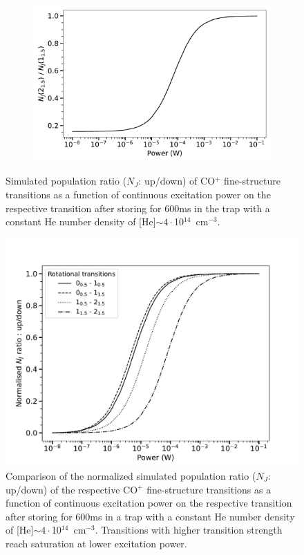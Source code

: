 \begin{figure}[!htb]
\begin{subfigure}[b]{0.49\textwidth}
    \end{subfigure}
    \hfill
    \begin{subfigure}[b]{0.49\textwidth}
        \centering
        \includegraphics[width=1\textwidth]{chapters/CO+_ROSAA_paper/SI/functionOfpower_CO^+_1_1.5 - 2_1.5_4.e+14.pdf}
    \end{subfigure}
    \caption{Simulated population ratio ($N_J$: up/down) of CO$^+$ fine-structure transitions as a function of continuous excitation power on the respective transition after storing for 600ms in the trap with a constant He number density of [He]$\sim4\cdot$10$^{14}$~cm$^{-3}$.}
    \label{fig:SI:CO+:power}
\end{figure}

\begin{figure}
    \centering
    \includegraphics[width=1\textwidth]{chapters/CO+_ROSAA_paper/SI/compareTransitions.pdf}
    \caption{Comparison of the normalized simulated population ratio ($N_J$: up/down) of the respective CO$^+$ fine-structure transitions as a function of continuous excitation power on the respective transition after storing for 600ms in a trap with a constant He number density of [He]$\sim4\cdot$10$^{14}$~cm$^{-3}$. Transitions with higher transition strength reach saturation at lower excitation power.}
    \label{fig:SI:CO+:power-norm}
\end{figure}